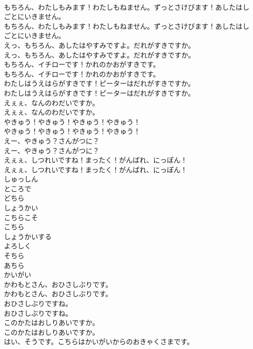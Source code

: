 \documentclass[8pt]{extreport}
\begin{document}
\begin{CJK}{UTF8}{min}
\\	もちろん、わたしもみます！わたしもねません。ずっとさけびます！あしたはしごとにいきません。	
\\	もちろん、わたしもみます！わたしもねません。ずっとさけびます！あしたはしごとにいきません。 
\\	えっ、もちろん、あしたはやすみですよ。だれがすきですか。	
\\	えっ、もちろん、あしたはやすみですよ。だれがすきですか。 
\\	もちろん、イチローです！かれのかおがすきです。	
\\	もちろん、イチローです！かれのかおがすきです。 
\\	わたしはうえはらがすきです！ピーターはだれがすきですか。	
\\	わたしはうえはらがすきです！ピーターはだれがすきですか。 
\\	えぇぇ、なんのわだいですか。	
\\	えぇぇ、なんのわだいですか。 
\\	やきゅう！やきゅう！やきゅう！やきゅう！	
\\	やきゅう！やきゅう！やきゅう！やきゅう！ 
\\	えー、やきゅう？さんがつに？	
\\	えー、やきゅう？さんがつに？ 
\\	えぇぇ、しつれいですね！まったく！がんばれ、にっぽん！	
\\	えぇぇ、しつれいですね！まったく！がんばれ、にっぽん！ 
\\	しゅっしん
\\	ところで
\\	どちら
\\	しょうかい
\\	こちらこそ
\\	こちら
\\	しょうかいする
\\	よろしく
\\	そちら
\\	あちら
\\	かいがい
\\	かわもとさん、おひさしぶりです。	
\\	かわもとさん、おひさしぶりです。 
\\	おひさしぶりですね。	
\\	おひさしぶりですね。 
\\	このかたはおしりあいですか。	
\\	このかたはおしりあいですか。 
\\	はい、そうです。こちらはかいがいからのおきゃくさまです。	

\end{CJK}
\end{document}
